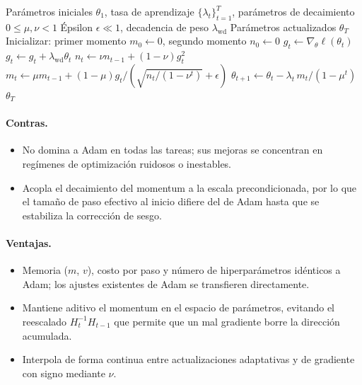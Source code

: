 \begin{algorithm}[H]
\caption{LaProp}
\label{alg:laprop}
\begin{algorithmic}[1]
\Require Parámetros iniciales $\theta_1$, tasa de aprendizaje $\{\lambda_t\}_{t=1}^T$, parámetros de decaimiento $0 \le \mu, \nu < 1$
\Require Épsilon $\epsilon \ll 1$, decadencia de peso $\lambda_{\mathrm{wd}}$
\Ensure Parámetros actualizados $\theta_T$
\State Inicializar: primer momento $m_0 \gets 0$, segundo momento $n_0 \gets 0$
    \State $g_t \gets \nabla_\theta \ell(\theta_t)$
        \State $g_t \gets g_t + \lambda_{\mathrm{wd}} \theta_t$ 
    \EndIf
    \State $n_t \gets \nu n_{t-1} + (1-\nu) g_t^2$
    \State $m_t \gets \mu m_{t-1} + (1-\mu) g_t / (\sqrt{n_t/(1-\nu^t)} + \epsilon)$
    \State $\theta_{t+1} \gets \theta_t - \lambda_t\, m_t / (1-\mu^t)$
\EndFor
\Return $\theta_T$
\end{algorithmic}
\end{algorithm}

\paragraph{Contras.}
\begin{itemize}[leftmargin=*]
\item No domina a Adam en todas las tareas; sus mejoras se concentran en regímenes de optimización ruidosos o inestables.
\item Acopla el decaimiento del momentum a la escala precondicionada, por lo que el tamaño de paso efectivo al inicio difiere del de Adam hasta que se estabiliza la corrección de sesgo.
\end{itemize}

\paragraph{Ventajas.}
\begin{itemize}[leftmargin=*]
\item Memoria ($m$, $v$), costo por paso y número de hiperparámetros idénticos a Adam; los ajustes existentes de Adam se transfieren directamente.
\item Mantiene aditivo el momentum en el espacio de parámetros, evitando el reescalado $H_t^{-1}H_{t-1}$ que permite que un mal gradiente borre la dirección acumulada.
\item Interpola de forma continua entre actualizaciones adaptativas y de gradiente con signo mediante $\nu$.
\end{itemize}
